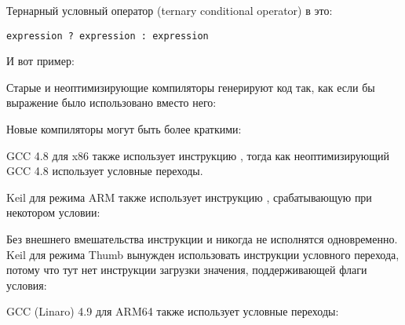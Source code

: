 \label{chap:cond}

Тернарный условный оператор (ternary conditional operator) в \CCpp это:

\begin{lstlisting}
expression ? expression : expression
\end{lstlisting}

И вот пример:




Старые и неоптимизирующие компиляторы генерируют код так, как если бы выражение  было использовано
вместо него:





Новые компиляторы могут быть более краткими:



\Optimizing GCC 4.8 для x86 также использует инструкцию ,
тогда как неоптимизирующий GCC 4.8 использует условные переходы.


\Optimizing Keil для режима ARM также использует инструкцию , срабатывающую при некотором
условии:



Без внешнего вмешательства инструкции  и  никогда не исполнятся одновременно.
\Optimizing Keil для режима Thumb вынужден использовать инструкции условного перехода, потому
что тут нет инструкции загрузки значения, поддерживающей флаги условия:




\Optimizing GCC (Linaro) 4.9 для ARM64 также использует условные переходы:



